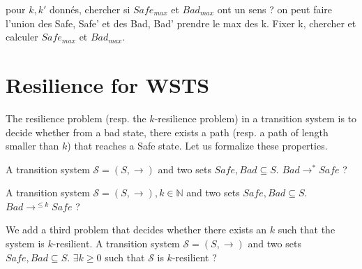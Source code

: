 

pour $k,k'$ donnés, chercher si $Safe_{max}$ et $Bad_{max}$ ont un sens ? on peut faire l'union des Safe, Safe' et des Bad, Bad' prendre le max des k. Fixer k, chercher et calculer $Safe_{max}$ et $Bad_{max}$.

%

\fi



\section{Resilience for WSTS}


The resilience problem (resp. the $k$-resilience problem) in a transition system is to decide whether from a bad state, there exists a path (resp. a path of length smaller than $k$) that reaches a Safe state. Let us formalize these properties.

{A transition system $\mathscr{S}=(S,\rightarrow)$ and two sets $Safe, Bad \subseteq S$.}
{$Bad \longrightarrow^{*} Safe$ ?\newline}
%

{A transition system $\mathscr{S}=(S,\rightarrow), k \in \mathbb{N}$ and two sets $Safe, Bad \subseteq S$.}
{$Bad \longrightarrow^{\leq k} Safe$ ?\newline}

We add a third problem that decides whether there exists an $k$ such  that the system is $k$-resilient.
%
{A transition system $\mathscr{S}=(S,\rightarrow)$ and two sets $Safe, Bad \subseteq S$.}
{$\exists k \geq 0$ such that $\mathscr{S}$ is %
 $k$-resilient ?\newline}


